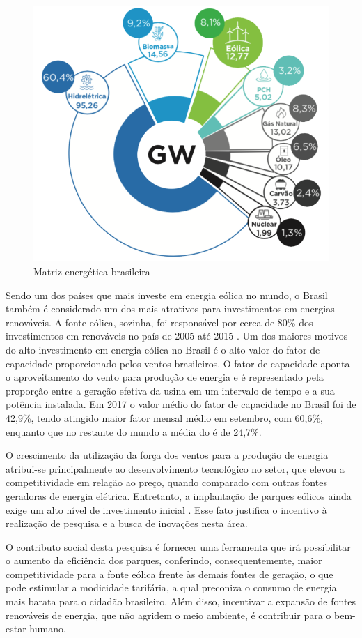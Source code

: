 \begin{figure}[htbp!] \begin{center}
\includegraphics[width=0.65\linewidth]{./figuras/matriz-energetica-brasileira}
\caption{Matriz energética brasileira}
\label{Fig:matriz-energetica-brasileira}
\end{center} 
\end{figure}

Sendo um dos países que mais investe em energia eólica no mundo, o Brasil também é considerado um dos mais atrativos para investimentos em energias renováveis. A fonte eólica, sozinha, foi responsável por cerca de 80\% dos investimentos em renováveis no país de 2005 até 2015 \cite{CENARIO}. Um dos maiores motivos do alto investimento em energia eólica no Brasil é o alto valor do fator de capacidade proporcionado pelos ventos brasileiros. O fator de capacidade aponta o aproveitamento do vento para produção de energia e é representado pela proporção entre a geração efetiva da usina em um intervalo de tempo e a sua potência instalada. Em 2017 o valor médio do fator de capacidade no Brasil foi de 42,9\%, tendo atingido maior fator mensal médio em setembro, com 60,6\%, enquanto que no restante do mundo a média do é de 24,7\%\cite{boletim-anual-geracao-2017}.

O crescimento da utilização da força dos ventos para a produção de energia atribui-se principalmente ao desenvolvimento tecnológico no setor, que elevou a competitividade em relação ao preço, quando comparado com outras fontes geradoras de energia elétrica. Entretanto, a implantação de parques eólicos ainda exige um alto nível de investimento inicial \cite{matrizes-energeticas-brasil}. Esse fato justifica o incentivo à realização de pesquisa e a busca de inovações nesta área.

O contributo social desta pesquisa é fornecer uma ferramenta que irá possibilitar o aumento da eficiência dos parques, conferindo, consequentemente, maior competitividade para a fonte eólica frente às demais fontes de geração, o que pode estimular a modicidade tarifária, a qual preconiza o consumo de energia mais barata para o cidadão brasileiro. Além disso, incentivar a expansão de fontes renováveis de energia, que não agridem o meio ambiente, é contribuir para o bem-estar humano.

